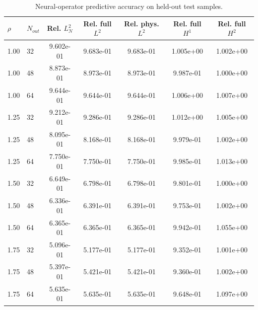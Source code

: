\begin{table}[h]
\centering
\small
\begin{tabular}{llccccc}
\toprule
$\rho$ & $N_{out}$ & Rel. $L^2_N$ & Rel. full $L^2$ & Rel. phys. $L^2$ & Rel. full $H^{1}$ & Rel. full $H^{2}$ \\
\midrule
1.00 & 32 & 9.602e-01 & 9.683e-01 & 9.683e-01 & 1.005e+00 & 1.002e+00 \\
1.00 & 48 & 8.873e-01 & 8.973e-01 & 8.973e-01 & 9.987e-01 & 1.000e+00 \\
1.00 & 64 & 9.644e-01 & 9.644e-01 & 9.644e-01 & 1.006e+00 & 1.007e+00 \\
1.25 & 32 & 9.212e-01 & 9.286e-01 & 9.286e-01 & 1.012e+00 & 1.005e+00 \\
1.25 & 48 & 8.095e-01 & 8.168e-01 & 8.168e-01 & 9.979e-01 & 1.002e+00 \\
1.25 & 64 & 7.750e-01 & 7.750e-01 & 7.750e-01 & 9.985e-01 & 1.013e+00 \\
1.50 & 32 & 6.649e-01 & 6.798e-01 & 6.798e-01 & 9.801e-01 & 1.000e+00 \\
1.50 & 48 & 6.336e-01 & 6.391e-01 & 6.391e-01 & 9.753e-01 & 1.002e+00 \\
1.50 & 64 & 6.365e-01 & 6.365e-01 & 6.365e-01 & 9.942e-01 & 1.055e+00 \\
1.75 & 32 & 5.096e-01 & 5.177e-01 & 5.177e-01 & 9.352e-01 & 1.001e+00 \\
1.75 & 48 & 5.397e-01 & 5.421e-01 & 5.421e-01 & 9.360e-01 & 1.002e+00 \\
1.75 & 64 & 5.635e-01 & 5.635e-01 & 5.635e-01 & 9.648e-01 & 1.097e+00 \\
\bottomrule
\end{tabular}
\caption{Neural-operator predictive accuracy on held-out test samples.}
\label{tab:operator_accuracy_step_index_fiber}
\end{table}
